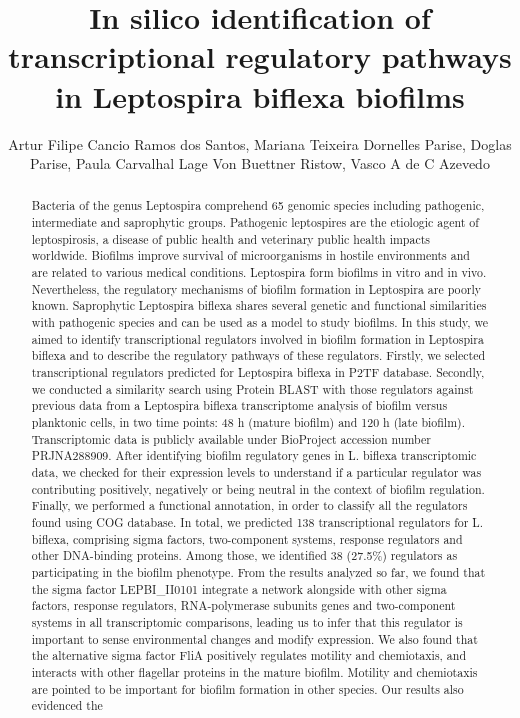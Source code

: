 \documentclass[twoside]{article}
\title{\vspace{-15mm}\fontsize{24pt}{10pt}\selectfont\textbf{ In silico identification of transcriptional regulatory pathways in Leptospira biflexa biofilms }} %
\author{ Artur Filipe Cancio Ramos dos Santos, Mariana Teixeira Dornelles Parise, Doglas Parise, Paula Carvalhal Lage Von Buettner Ristow, Vasco A de C Azevedo }
\affil{ UFMG }
\date{}
\begin{document}
  
  
  \maketitle %
  
  
  \thispagestyle{fancy} %
  
  
  \begin{abstract}
  Bacteria of the genus Leptospira comprehend 65 genomic species including pathogenic,  intermediate and saprophytic groups. Pathogenic leptospires are the etiologic agent of leptospirosis,  a disease of public health and veterinary public health impacts worldwide. Biofilms improve survival of microorganisms in hostile environments and are related to various medical conditions. Leptospira form biofilms in vitro and in vivo. Nevertheless,  the regulatory mechanisms of biofilm formation in Leptospira are poorly known. Saprophytic Leptospira biflexa shares several genetic and functional similarities with pathogenic species and can be used as a model to study biofilms. In this study,  we aimed to identify transcriptional regulators involved in biofilm formation in Leptospira biflexa and to describe the regulatory pathways of these regulators. Firstly,  we selected transcriptional regulators predicted for Leptospira biflexa in P2TF database. Secondly,  we conducted a similarity search using Protein BLAST with those regulators against previous data from a Leptospira biflexa transcriptome analysis of biofilm versus planktonic cells,  in two time points: 48 h (mature biofilm) and 120 h (late biofilm). Transcriptomic data is publicly available under BioProject accession number PRJNA288909. After identifying biofilm regulatory genes in L. biflexa transcriptomic data,  we checked for their expression levels to understand if a particular regulator was contributing positively,  negatively or being neutral in the context of biofilm regulation. Finally,  we performed a functional annotation,  in order to classify all the regulators found using COG database. In total,  we predicted 138 transcriptional regulators for L. biflexa,  comprising sigma factors,  two-component systems,  response regulators and other DNA-binding proteins. Among those,  we identified 38 (27.5\%) regulators as participating in the biofilm phenotype. From the results analyzed so far,  we found that the sigma factor LEPBI\_II0101 integrate a network alongside with other sigma factors,  response regulators,  RNA-polymerase subunits genes and two-component systems in all transcriptomic comparisons,  leading us to infer that this regulator is important to sense environmental changes and modify expression. We also found that the alternative sigma factor FliA positively regulates motility and chemiotaxis,  and interacts with other flagellar proteins in the mature biofilm. Motility and chemiotaxis are pointed to be important for biofilm formation in other species. Our results also evidenced the 
\end{abstract}
\end{document}
